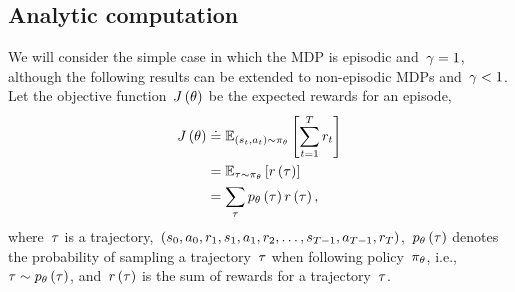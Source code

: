 \subsection{Analytic computation}
We will consider the simple case in which the MDP is episodic and~${\gamma=1}$, although the following results can be extended to non-episodic MDPs and~${\gamma<1}$. Let the objective function~${J\left(\theta\right)}$ be the expected rewards for an episode,
\begin{align}
	J\left(\theta\right)
		&\doteq\mathbb{E}_{\left(s_{t},a_{t}\right)\sim\pi_{\theta}}\left[\sum_{t=1}^{T}r_{t}\right] \notag \\
		&=\mathbb{E}_{\tau\sim\pi_{\theta}}\left[r\left(\tau\right)\right] \notag \\
		&=\sum_{\tau}p_{\theta}\left(\tau\right)r\left(\tau\right),	
\end{align}
where~${\tau}$ is a trajectory,~${\left(s_{0},a_{0},r_{1},s_{1},a_{1},r_{2},\dots,s_{T-1},a_{T-1},r_{T}\right)}$,~${p_{\theta}\left(\tau\right)}$ denotes the probability of sampling a trajectory~${\tau}$ when following policy~${\pi_{\theta}}$, i.e.,~${\tau\sim p_{\theta}\left(\tau\right)}$, and~${r\left(\tau\right)}$ is the sum of rewards for a trajectory~${\tau}$.

